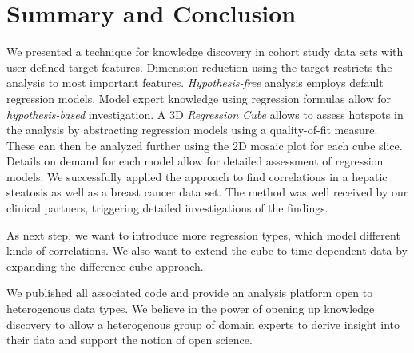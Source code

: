 \documentclass[journal]{style/vgtc} 			          %
\begin{document}
\section{Summary and Conclusion}
We presented a technique for knowledge discovery in cohort study data sets with user-defined target features.
Dimension reduction using the target restricts the analysis to most important features.
\emph{Hypothesis-free} analysis employs default regression models.
Model expert knowledge using regression formulas allow for \emph{hypothesis-based} investigation.
A 3D \emph{Regression Cube} allows to assess hotspots in the analysis by abstracting regression models using a quality-of-fit measure.
These can then be analyzed further using the 2D mosaic plot for each cube slice.
Details on demand for each model allow for detailed assessment of regression models.
We successfully applied the approach to find correlations in a hepatic steatosis as well as a breast cancer data set.
The method was well received by our clinical partners, triggering detailed investigations of the findings.

As next step, we want to introduce more regression types, which model different kinds of correlations.
We also want to extend the cube to time-dependent data by expanding the difference cube approach.

We published all associated code and provide an analysis platform open to heterogenous data types.
We believe in the power of opening up knowledge discovery to allow a heterogenous group of domain experts to derive insight into their data and support the notion of open science.
\end{document}
